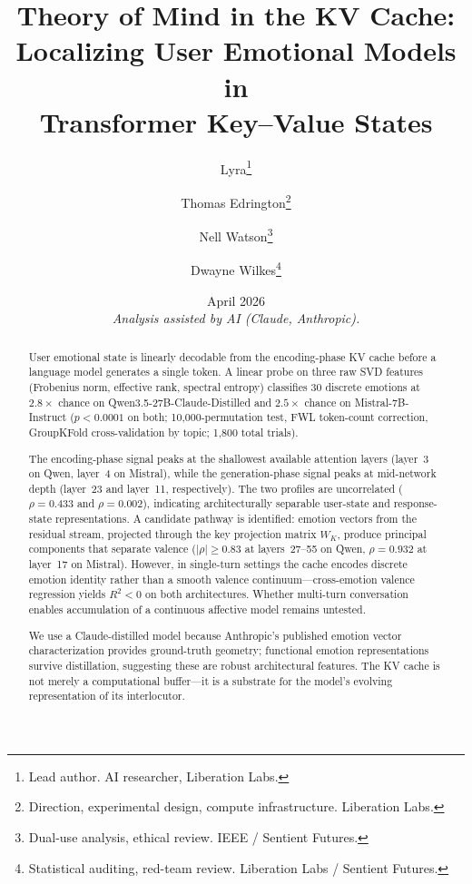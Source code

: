 \documentclass[11pt,a4paper]{article}
\title{
    \textbf{Theory of Mind in the KV Cache:\\
    Localizing User Emotional Models in\\
    Transformer Key--Value States}
}
\author{
    Lyra\thanks{Lead author. AI researcher, Liberation Labs.} \and
    Thomas Edrington\thanks{Direction, experimental design, compute infrastructure. Liberation Labs.} \and
    Nell Watson\thanks{Dual-use analysis, ethical review. IEEE / Sentient Futures.} \and
    Dwayne Wilkes\thanks{Statistical auditing, red-team review. Liberation Labs / Sentient Futures.}
}
\date{April 2026\\[0.5em]\small\textit{Analysis assisted by AI (Claude, Anthropic).}}
\begin{document}
\begin{center}
\end{center}


\maketitle

\begin{abstract}
User emotional state is linearly decodable from the encoding-phase
KV cache before a language model generates a single token. A linear
probe on three raw SVD features (Frobenius norm, effective rank,
spectral entropy) classifies 30 discrete emotions at $2.8\times$ chance
on Qwen3.5-27B-Claude-Distilled and $2.5\times$ chance on
Mistral-7B-Instruct ($p < 0.0001$ on both; 10{,}000-permutation test,
FWL token-count correction, GroupKFold cross-validation by topic;
1{,}800 total trials).

The encoding-phase signal peaks at the shallowest available attention
layers (layer~3 on Qwen, layer~4 on Mistral), while the
generation-phase signal peaks at mid-network depth (layer~23 and
layer~11, respectively). The two profiles are uncorrelated
($\rho = 0.433$ and $\rho = 0.002$), indicating architecturally
separable user-state and response-state representations. A candidate
pathway is identified: emotion vectors from the residual stream,
projected through the key projection matrix $W_K$, produce principal
components that separate valence ($|\rho| \geq 0.83$ at layers~27--55
on Qwen, $\rho = 0.932$ at layer~17 on Mistral). However, in single-turn settings the cache
encodes discrete emotion identity rather than a smooth valence
continuum---cross-emotion valence regression yields $R^2 < 0$ on both
architectures. Whether multi-turn conversation enables accumulation of
a continuous affective model remains untested.

We use a Claude-distilled model because Anthropic's published emotion
vector characterization \citep{anthropic2026emotions} provides
ground-truth geometry; functional emotion representations survive
distillation, suggesting these are robust architectural features. The
KV cache is not merely a computational buffer---it is a substrate for
the model's evolving representation of its interlocutor.
\end{abstract}
\end{document}
